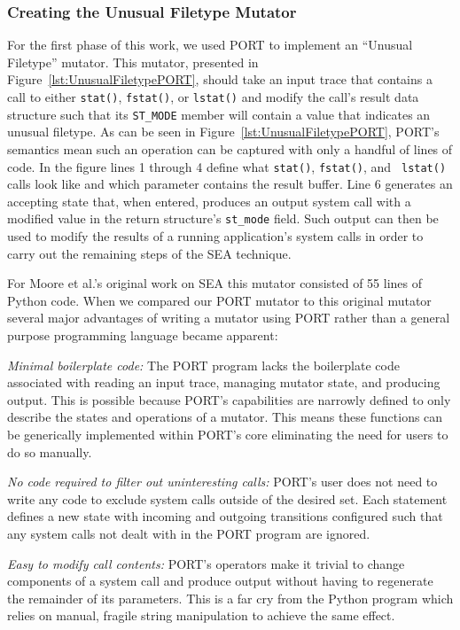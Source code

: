 \subsubsection{Creating the Unusual Filetype Mutator}
\label{subsub:UnusualFiletype}
For the first phase of this work,
we used PORT to implement an ``Unusual Filetype''
mutator.
This mutator, presented in
Figure~\ref{lst:UnusualFiletypePORT},
should take an input trace
that contains a call to either {\tt stat()},
{\tt fstat()},
or {\tt lstat()}
and modify the call's result data structure such
that its {\tt ST\_MODE} member will contain a value
that indicates an unusual filetype.
As can be seen in
Figure~\ref{lst:UnusualFiletypePORT}, PORT's semantics mean such an
operation can be captured with only a handful of lines of code.  In the
figure
lines 1 through 4 define what {\tt stat()}, {\tt fstat()}, and {\tt
lstat()} calls look like and which parameter contains the result buffer.
Line 6 generates an accepting state that, when entered, produces an output
system call with a modified value in the return structure's {\tt st\_mode}
field.  Such output can then be used to modify the results of a running
application's system calls in order to carry out the remaining steps of the
SEA technique.

For Moore et al.'s original work on SEA this mutator consisted of 55 lines
of Python code.
When we compared our PORT mutator to this original mutator
several major advantages
of writing a mutator using
PORT rather than a general purpose programming language
became apparent:

\textit{Minimal boilerplate code:} The PORT program lacks the boilerplate
code associated with
reading an input trace, managing mutator state, and producing output.
This is possible because PORT's capabilities are narrowly defined to
only describe the states and operations of a mutator.  This means these
functions can be generically implemented within PORT's core eliminating
the need for users to do so manually.

\textit{No code required to filter out uninteresting calls:}
PORT's user does
not need to write any code to exclude system
calls outside of the desired set.  Each statement defines a new state with
incoming and outgoing transitions configured such that any system calls not
dealt with in the PORT program are ignored.

\textit{Easy to modify call contents:}  PORT's operators make it
trivial to change components of a system call
and produce output without having to regenerate the remainder of its
parameters.
This is a far cry
from the Python program which relies on manual, fragile string manipulation
to achieve the same effect.

